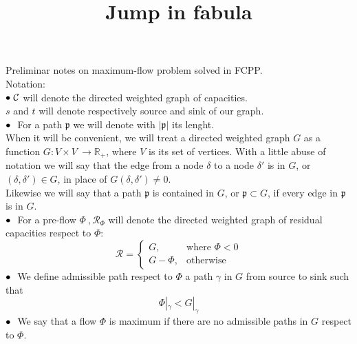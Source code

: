 \documentclass{article}
\title{Jump in fabula}
\author{}
\date{}
\theoremstyle{plain}
\theoremstyle{definition}
\theoremstyle{remark}
\begin{document}
Preliminar notes on maximum-flow problem solved in FCPP.\\
Notation:\\
 $\small\bullet\ \mathcal{C}$ will denote the directed weighted graph of capacities.\\
 $s$ and $t$ will denote respectively source and sink of our graph.\\
 $\small\bullet\ $  For a path $\mathfrak{p}$ we will denote with $|\mathfrak{p}|$ its lenght.\\

When it will be convenient, we will treat a directed weighted graph $G$ as a function $G: V\times V\ \rightarrow \mathbb{R_{+}}$, where $V$ is its set of vertices. With a little abuse of notation we will say that the edge from a node $\delta$ to a node $\delta'$ is in $G$, or $(\delta, \delta') \in G$,  in place of $G(\delta, \delta') \not= 0$.\\
Likewise we will say that a path $\mathfrak{p}$ is contained in $G$, or $\mathfrak{p}\subset G$, if every edge in $\mathfrak{p}$ is in $G$.\\

 $\small\bullet\ $ For a pre-flow $\Phi\ , \mathcal{R}_{\Phi}$ will denote the directed weighted graph of residual capacities respect to $\Phi$:
\begin{equation}
\label{eq:residual-capacity}
\mathcal{R} =
\begin{cases}
    G,& \text{where } \Phi< 0\\
    G-\Phi,              & \text{otherwise}
\end{cases}
\end{equation}
$\small\bullet\ $  We define admissible path respect to $\Phi$  a path $\gamma$ in $G$ from source to sink such that 
\begin{equation*}
\Phi|_{\gamma} < G|_{\gamma}
\end{equation*}
$\small\bullet\ $ We say that a flow $\Phi$ is maximum if there are no admissible paths in $G$ respect to $\Phi$.
\end{document}
